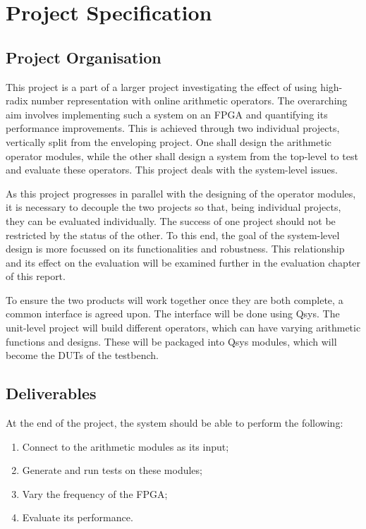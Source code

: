 \section{Project Specification}

\subsection{Project Organisation}
This project is a part of a larger project investigating the effect of using
high-radix number representation with online arithmetic operators.
The overarching aim involves implementing such a system on an FPGA and
quantifying its performance improvements.
This is achieved through two individual projects, vertically split from
the enveloping project.
One shall design the arithmetic operator modules,
while the other shall design a system from the top-level to test and
evaluate these operators.
This project deals with the system-level issues.

As this project progresses in parallel with the designing of the operator
modules, it is necessary to decouple the two projects so that, being individual
projects, they can be evaluated individually.
The success of one project should not be restricted by the status of the other.
To this end, the goal of the system-level design is more focussed on its
functionalities and robustness.
This relationship and its effect on the evaluation will be examined further in
the evaluation chapter of this report.

To ensure the two products will work together once they are both complete, a
common interface is agreed upon.
The interface will be done using Qsys.
The unit-level project will build different operators, which can have varying
arithmetic functions and designs.
These will be packaged into Qsys modules, which will become the DUTs of the
testbench.

\subsection{Deliverables}
At the end of the project, the system should be able to perform the following:
\begin{enumerate}
  \item Connect to the arithmetic modules as its input;
  \item Generate and run tests on these modules;
  \item Vary the frequency of the FPGA;
  \item Evaluate its performance.
\end{enumerate}

